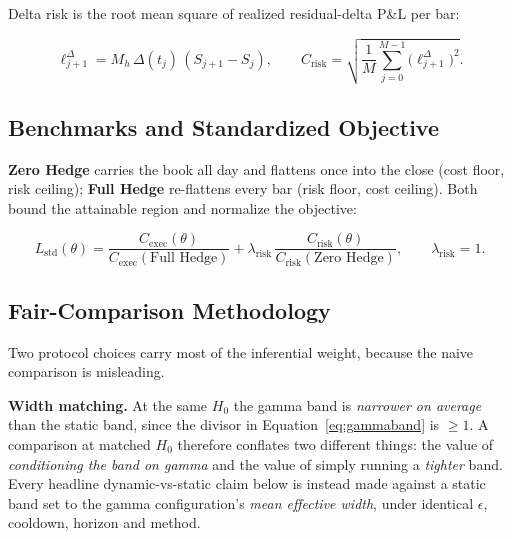 \documentclass{article}
\begin{document}
Delta risk is the root mean square of realized residual-delta P\&L per bar:

\begin{eqbox}
\begin{equation}
\ell^{\Delta}_{j+1} = M_h\,\Delta(t_j)\,(S_{j+1} - S_j),
\qquad
C_{\text{risk}} = \sqrt{ \frac{1}{M} \sum_{j=0}^{M-1} \big(\ell^{\Delta}_{j+1}\big)^{2} }.
\end{equation}
\end{eqbox}

\subsection{Benchmarks and Standardized Objective}

\textbf{Zero Hedge} carries the book all day and flattens once into the close (cost floor,
risk ceiling); \textbf{Full Hedge} re-flattens every bar (risk floor, cost ceiling). Both
bound the attainable region and normalize the objective:

\begin{eqbox}
\begin{equation}
L_{\text{std}}(\theta) =
\frac{C_{\text{exec}}(\theta)}{C_{\text{exec}}(\text{Full Hedge})}
+ \lambda_{\text{risk}}\,
\frac{C_{\text{risk}}(\theta)}{C_{\text{risk}}(\text{Zero Hedge})},
\qquad \lambda_{\text{risk}} = 1 .
\end{equation}
\end{eqbox}

\subsection{Fair-Comparison Methodology}

Two protocol choices carry most of the inferential weight, because the naive comparison
is misleading.

\textbf{Width matching.} At the same $H_0$ the gamma band is \emph{narrower on average}
than the static band, since the divisor in Equation~\eqref{eq:gammaband} is $\ge 1$. A
comparison at matched $H_0$ therefore conflates two different things: the value of
\emph{conditioning the band on gamma} and the value of simply running a \emph{tighter}
band. Every headline dynamic-vs-static claim below is instead made against a static band
set to the gamma configuration's \emph{mean effective width}, under identical
$\epsilon$, cooldown, horizon and method.
\end{document}
